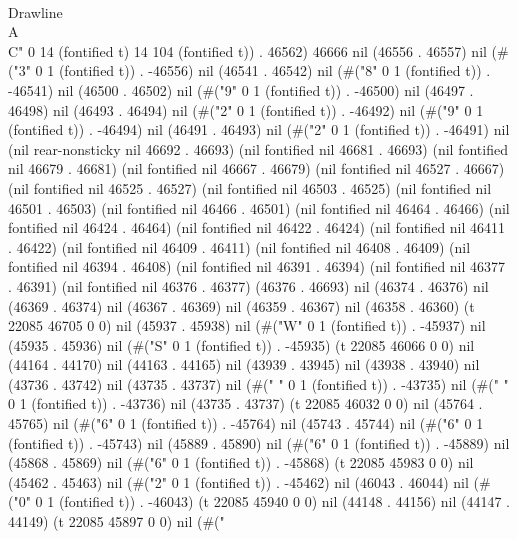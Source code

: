    \\Drawline{\\A\\C}" 0 14 (fontified t) 14 104 (fontified t)) . 46562) 46666 nil (46556 . 46557) nil (#("3" 0 1 (fontified t)) . -46556) nil (46541 . 46542) nil (#("8" 0 1 (fontified t)) . -46541) nil (46500 . 46502) nil (#("9" 0 1 (fontified t)) . -46500) nil (46497 . 46498) nil (46493 . 46494) nil (#("2" 0 1 (fontified t)) . -46492) nil (#("9" 0 1 (fontified t)) . -46494) nil (46491 . 46493) nil (#("2" 0 1 (fontified t)) . -46491) nil (nil rear-nonsticky nil 46692 . 46693) (nil fontified nil 46681 . 46693) (nil fontified nil 46679 . 46681) (nil fontified nil 46667 . 46679) (nil fontified nil 46527 . 46667) (nil fontified nil 46525 . 46527) (nil fontified nil 46503 . 46525) (nil fontified nil 46501 . 46503) (nil fontified nil 46466 . 46501) (nil fontified nil 46464 . 46466) (nil fontified nil 46424 . 46464) (nil fontified nil 46422 . 46424) (nil fontified nil 46411 . 46422) (nil fontified nil 46409 . 46411) (nil fontified nil 46408 . 46409) (nil fontified nil 46394 . 46408) (nil fontified nil 46391 . 46394) (nil fontified nil 46377 . 46391) (nil fontified nil 46376 . 46377) (46376 . 46693) nil (46374 . 46376) nil (46369 . 46374) nil (46367 . 46369) nil (46359 . 46367) nil (46358 . 46360) (t 22085 46705 0 0) nil (45937 . 45938) nil (#("W" 0 1 (fontified t)) . -45937) nil (45935 . 45936) nil (#("S" 0 1 (fontified t)) . -45935) (t 22085 46066 0 0) nil (44164 . 44170) nil (44163 . 44165) nil (43939 . 43945) nil (43938 . 43940) nil (43736 . 43742) nil (43735 . 43737) nil (#(" " 0 1 (fontified t)) . -43735) nil (#(" " 0 1 (fontified t)) . -43736) nil (43735 . 43737) (t 22085 46032 0 0) nil (45764 . 45765) nil (#("6" 0 1 (fontified t)) . -45764) nil (45743 . 45744) nil (#("6" 0 1 (fontified t)) . -45743) nil (45889 . 45890) nil (#("6" 0 1 (fontified t)) . -45889) nil (45868 . 45869) nil (#("6" 0 1 (fontified t)) . -45868) (t 22085 45983 0 0) nil (45462 . 45463) nil (#("2" 0 1 (fontified t)) . -45462) nil (46043 . 46044) nil (#("0" 0 1 (fontified t)) . -46043) (t 22085 45940 0 0) nil (44148 . 44156) nil (44147 . 44149) (t 22085 45897 0 0) nil (#("
